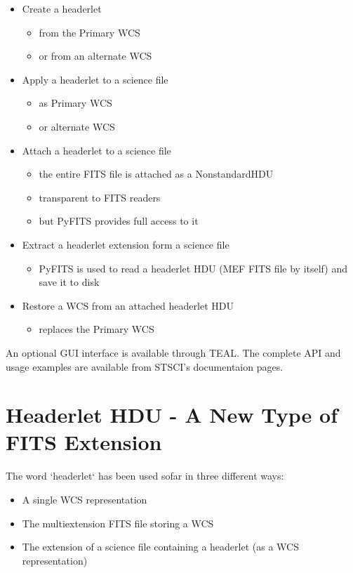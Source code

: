 \begin{itemize}
\item Create a headerlet
\begin{itemize}
  \item from the Primary WCS
  \item or from an alternate WCS
\end{itemize}
\item Apply a headerlet to a science file
\begin{itemize}
  \item as Primary WCS
  \item or alternate WCS
\end{itemize}
\item Attach a headerlet to a science file
\begin{itemize}
  \item the entire FITS file is attached as a NonstandardHDU
  \item transparent to FITS readers
  \item but PyFITS provides full access to it
\end{itemize}
\item Extract a headerlet extension form a science file
\begin{itemize}
  \item PyFITS is used to read a headerlet HDU (MEF FITS file by itself) and save it to disk
\end{itemize}
\item Restore a WCS from an attached headerlet HDU
\begin{itemize}
  \item replaces the Primary WCS
\end{itemize}
\end{itemize}

An optional GUI interface is available through TEAL.
The complete API and usage examples are available from STSCI's documentaion pages.

\section{Headerlet HDU - A New Type of FITS Extension}
The word `headerlet` has been used sofar in three different ways:

\begin{itemize}
\item A single WCS representation
\item The multiextension FITS file storing a WCS
\item The extension of a science file containing a headerlet (as a WCS representation)
\end{itemize}

